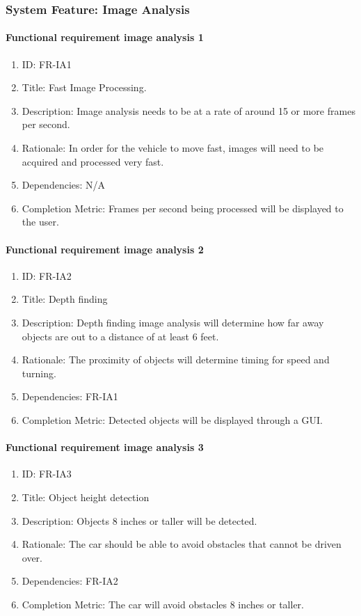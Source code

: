 \documentclass[compsoc,draftclsnofoot,onecolumn,10pt]{IEEEtran}
\begin{document}
\subsubsection{System Feature: Image Analysis}
	
	\paragraph{Functional requirement image analysis 1}
		\begin{enumerate}
			\item ID: FR-IA1
			\item Title: Fast Image Processing.
			\item Description: Image analysis needs to be at a rate of around 15 or more frames per second.
			\item Rationale: In order for the vehicle to move fast, images will need to be acquired and processed very fast.
			\item Dependencies: N/A
			\item Completion Metric: Frames per second being processed will be displayed to the user. 
		\end{enumerate}	

	\paragraph{Functional requirement image analysis 2}
		\begin{enumerate}
			\item ID: FR-IA2
			\item Title: Depth finding
			\item Description: Depth finding image analysis will determine how far away objects are out to a distance of at least 6 feet.
			\item Rationale: The proximity of objects will determine timing for speed and turning. 
			\item Dependencies: FR-IA1
			\item Completion Metric: Detected objects will be displayed through a GUI.
		\end{enumerate}
	
	\paragraph{Functional requirement image analysis 3}
		\begin{enumerate}
			\item ID: FR-IA3
			\item Title: Object height detection
			\item Description: Objects 8 inches or taller will be detected.
			\item Rationale: The car should be able to avoid obstacles that cannot be driven over.
			\item Dependencies: FR-IA2
			\item Completion Metric: The car will avoid obstacles 8 inches or taller.
		\end{enumerate}
\end{document}
